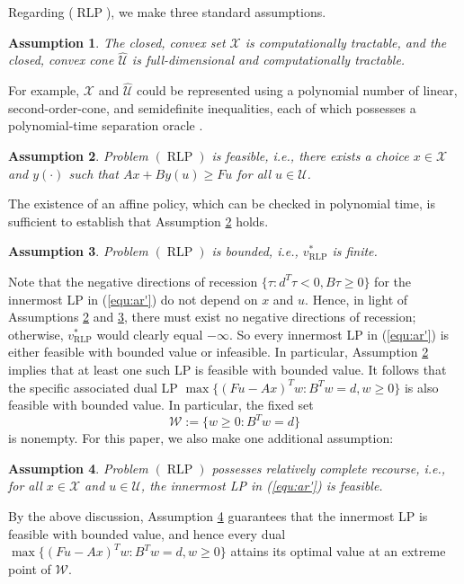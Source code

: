 \documentclass[12pt]{article}
\DeclareMathOperator{\AR}{RLP}
\newtheorem{assumption}{Assumption}
\newcommand{\U}{{\mathcal{U}}}
\newcommand{\W}{{\mathcal{W}}}
\newcommand{\K}{\widehat{\mathcal{U}}}
\newcommand{\X}{{\mathcal{X}}}
\begin{document}
\begin{onehalfspace}
Regarding ($\AR$), we make three standard assumptions.

\begin{assumption} \label{ass:tractable}
The closed, convex set $\X$ is computationally tractable, and the
closed, convex cone $\K$ is full-dimensional and computationally
tractable.
\end{assumption}

\noindent For example, $\X$ and $\K$ could be represented using a
polynomial number of linear, second-order-cone, and semidefinite
inequalities, each of which possesses a polynomial-time separation
oracle \cite{Grotschel.Lovasz.Shrijver.1981}.

\begin{assumption} \label{ass:feas}
Problem $(\AR)$ is feasible, i.e., there exists a choice $x \in \X$ and
$y(\cdot)$ such that $Ax + B y(u) \ge Fu$ for all $u \in \U$.
\end{assumption}

\noindent The existence of an affine policy, which can be checked
in polynomial time, is sufficient to establish that Assumption
\ref{ass:feas} holds.

\begin{assumption} \label{ass:boundedval}
Problem $(\AR)$ is bounded, i.e., $v^*_{\AR}$ is finite. 
\end{assumption}

\noindent Note that the negative directions of recession $\{ \tau : d^T
\tau < 0, B \tau \ge 0 \}$ for the innermost LP in (\ref{equ:ar'}) do
not depend on $x$ and $u$. Hence, in light of Assumptions \ref{ass:feas}
and \ref{ass:boundedval}, there must exist no negative directions of
recession; otherwise, $v^*_{\AR}$ would clearly equal $-\infty$. So
every innermost LP in (\ref{equ:ar'}) is either feasible with bounded value or
infeasible. In particular, Assumption \ref{ass:feas} implies that at
least one such LP is feasible with bounded value. It follows that the specific
associated dual LP $\max\{ (Fu - Ax)^T w : B^T w = d, w \ge 0 \}$ is
also feasible with bounded value. In particular, the fixed set
\[
    \W := \{ w \ge 0 : B^T w = d \}
\]
is nonempty. For this paper, we also make one additional assumption:
%
\begin{assumption} \label{ass:rcr}
Problem $(\AR)$ possesses relatively complete recourse, i.e., for all $x
\in \X$ and $u \in \U$, the innermost LP in (\ref{equ:ar'}) is feasible.
\end{assumption}

\noindent By the above discussion, Assumption \ref{ass:rcr} guarantees
that the innermost LP is feasible with bounded value, and hence every
dual $\max\{ (Fu - Ax)^T w : B^T w = d, w \ge 0 \}$ attains its optimal
value at an extreme point of $\W$.


\end{onehalfspace}
\end{document}
